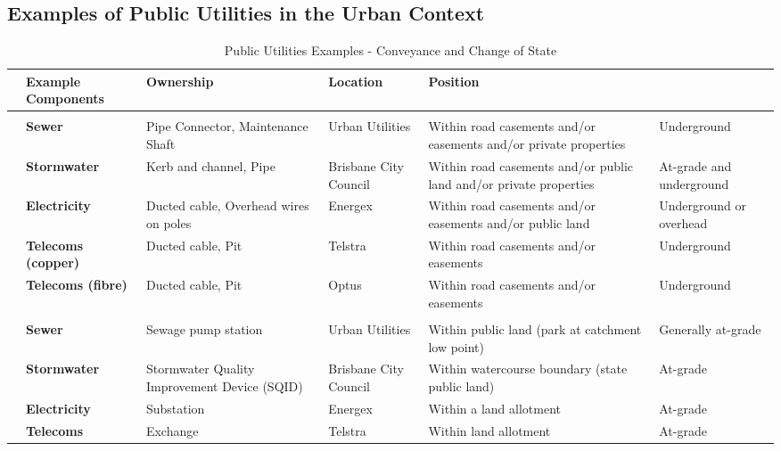 \documentclass{report}
\begin{document}
	\subsection{Examples of Public Utilities in the Urban Context}

	\begin{table}[h!]
	\centering
	\caption{Public Utilities Examples - Conveyance and Change of State}
	\renewcommand{\arraystretch}{1.5}
	\small
	\begin{tabular}{|>{\bfseries}l|>{\bfseries}p{2.5cm}|p{3.5cm}|p{2cm}|p{3.5cm}|p{2cm}|}
	\toprule
	\rowcolor{blue!30}
	\multicolumn{2}{|c|}{\textbf{Type}} & \textbf{Example Components} & \textbf{Ownership} & \textbf{Location} & \textbf{Position} \\
	\midrule
	\multicolumn{6}{|c|}{\cellcolor{blue!15}\textbf{CONVEYANCE PUBLIC UTILITIES}} \\
	\midrule
	\multirow{5}{*}{\rotatebox[origin=c]{90}{\textbf{Conveyance}}} 
	& Sewer & Pipe Connector, Maintenance Shaft & Urban Utilities & Within road casements and/or easements and/or private properties & Underground \\
	\cline{2-6}
	& Stormwater & Kerb and channel, Pipe & Brisbane City Council & Within road casements and/or public land and/or private properties & At-grade and underground \\
	\cline{2-6}
	& Electricity & Ducted cable, Overhead wires on poles & Energex & Within road casements and/or easements and/or public land & Underground or overhead \\
	\cline{2-6}
	& Telecoms (copper) & Ducted cable, Pit & Telstra & Within road casements and/or easements & Underground \\
	\cline{2-6}
	& Telecoms (fibre) & Ducted cable, Pit & Optus & Within road casements and/or easements & Underground \\
	\midrule
	\multicolumn{6}{|c|}{\cellcolor{green!15}\textbf{CHANGE OF STATE PUBLIC UTILITIES}} \\
	\midrule
	\multirow{4}{*}{\rotatebox[origin=c]{90}{\textbf{Change}}} 
	& Sewer & Sewage pump station & Urban Utilities & Within public land (park at catchment low point) & Generally at-grade \\
	\cline{2-6}
	& Stormwater & Stormwater Quality Improvement Device (SQID) & Brisbane City Council & Within watercourse boundary (state public land) & At-grade \\
	\cline{2-6}
	& Electricity & Substation & Energex & Within a land allotment & At-grade \\
	\cline{2-6}
	& Telecoms & Exchange & Telstra & Within land allotment & At-grade \\
	\bottomrule
	\end{tabular}
	\end{table}
\end{document}
